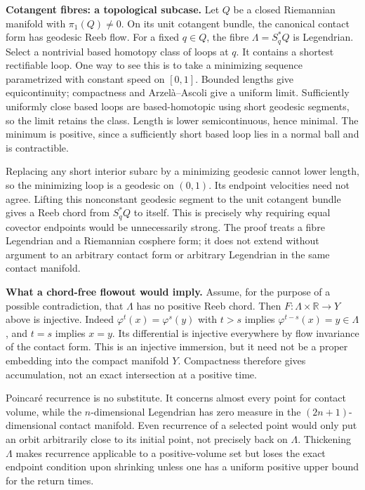 \documentclass[11pt]{article}
\begin{document}
\textbf{Cotangent fibres: a topological subcase.}
Let $Q$ be a closed Riemannian manifold with $\pi_1(Q)\ne0$.  On its unit
cotangent bundle, the canonical contact form has geodesic Reeb flow.  For a
fixed $q\in Q$, the fibre $\Lambda=S_q^*Q$ is Legendrian.  Select a nontrivial
based homotopy class of loops at $q$.  It contains a shortest rectifiable
loop.  One way to see this is to take a minimizing sequence parametrized with
constant speed on $[0,1]$.  Bounded lengths give equicontinuity; compactness
and Arzel\`a--Ascoli give a uniform limit.  Sufficiently uniformly close
based loops are based-homotopic using short geodesic segments, so the limit
retains the class.  Length is lower semicontinuous, hence minimal.  The
minimum is positive, since a sufficiently short based loop lies in a normal
ball and is contractible.

Replacing any short interior subarc by a minimizing geodesic cannot lower
length, so the minimizing loop is a geodesic on $(0,1)$.  Its endpoint
velocities need not agree.  Lifting this nonconstant geodesic segment to the
unit cotangent bundle gives a Reeb chord from $S_q^*Q$ to itself.  This is
precisely why requiring equal covector endpoints would be unnecessarily
strong.  The proof treats a fibre Legendrian and a Riemannian cosphere form;
it does not extend without argument to an arbitrary contact form or arbitrary
Legendrian in the same contact manifold.

\textbf{What a chord-free flowout would imply.}
Assume, for the purpose of a possible contradiction, that $\Lambda$ has no
positive Reeb chord.  Then $F:\Lambda\times\mathbb R\to Y$ above is injective.
Indeed $\varphi^t(x)=\varphi^s(y)$ with $t>s$ implies
$\varphi^{t-s}(x)=y\in\Lambda$, and $t=s$ implies $x=y$.
Its differential is injective everywhere by flow invariance of the contact
form.  This is an injective immersion, but it need not be a proper embedding
into the compact manifold $Y$.  Compactness therefore gives accumulation,
not an exact intersection at a positive time.

Poincar\'e recurrence is no substitute.  It concerns almost every point for
contact volume, while the $n$-dimensional Legendrian has zero measure in the
$(2n+1)$-dimensional contact manifold.  Even recurrence of a selected point
would only put an orbit arbitrarily close to its initial point, not precisely
back on $\Lambda$.  Thickening $\Lambda$ makes recurrence applicable to a
positive-volume set but loses the exact endpoint condition upon shrinking
unless one has a uniform positive upper bound for the return times.
\end{document}
